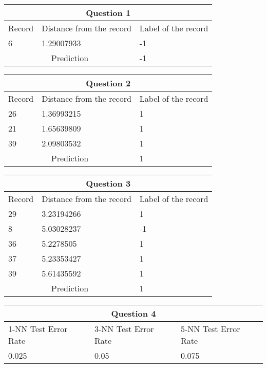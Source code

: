 \documentclass[10pt]{article}
\begin{document}
\begin{tabular}{ 
|p{3cm}||p{3cm}|p{3cm}|  }
 \hline
 \multicolumn{3}{|c|}{Question 1} \\
 \hline
 Record & Distance from the record& Label of the record\\
 \hline
 6 & 1.29007933 & -1\\
 \hline
 \multicolumn{2}{|c|}{Prediction} & -1\\
 \hline
 
\end{tabular}

\bigskip

\begin{tabular}{ 
|p{3cm}||p{3cm}|p{3cm}|  }
 \hline
 \multicolumn{3}{|c|}{Question 2} \\
 \hline
 
 Record & Distance from the record& Label of the record\\
 \hline
 26&1.36993215&1\\
 21&1.65639809&1\\
 39&2.09803532&1\\
 \hline
 \multicolumn{2}{|c|}{Prediction} & 1\\
 \hline
 
\end{tabular}

\bigskip

\begin{tabular}{ 
|p{3cm}||p{3cm}|p{3cm}|  }
 \hline
 \multicolumn{3}{|c|}{Question 3} \\
 \hline
 
 Record & Distance from the record& Label of the record\\
 \hline
 29&3.23194266&1\\
 8&5.03028237&-1\\
 36&5.2278505&1\\
 37&5.23353427&1\\
 39&5.61435592&1\\
 \hline
 \multicolumn{2}{|c|}{Prediction} & 1\\
 \hline
 
\end{tabular}

\bigskip

\begin{tabular}{ 
|p{3cm}||p{3cm}|p{3cm}|  }
 \hline
 \multicolumn{3}{|c|}{Question 4} \\
 \hline
 
 1-NN Test Error Rate & 3-NN Test Error Rate & 5-NN Test Error Rate\\
 \hline
 0.025&0.05&0.075\\
 \hline
 
\end{tabular}
\end{document}
